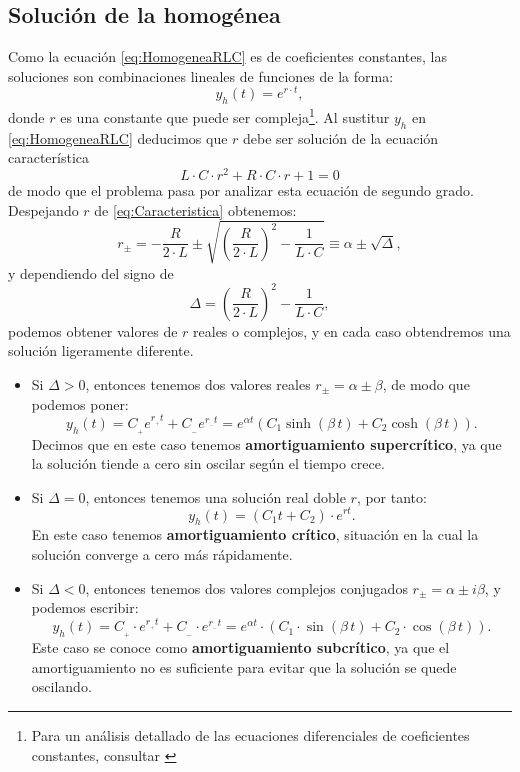 \subsection{Solución de la homogénea} \label{solucionHomogenea}
Como la ecuación \eqref{eq:HomogeneaRLC} es de coeficientes constantes, las soluciones son combinaciones lineales de funciones de la forma:
\[
y_h(t) = e^{r\cdot t},
\]
donde $r$ es una constante que puede ser compleja\footnote{Para un análisis detallado de las ecuaciones diferenciales de coeficientes constantes, consultar \cite[p.~226]{DiPrima}}. Al sustitur $y_h$ en \eqref{eq:HomogeneaRLC} deducimos que $r$ debe ser solución de la ecuación característica
\begin{equation}
\label{eq:Caracteristica}
  L\cdot C\cdot r^2 + R\cdot C\cdot r + 1 = 0
\end{equation}
de modo que el problema pasa por analizar esta ecuación de segundo grado. Despejando $r$ de \eqref{eq:Caracteristica} obtenemos:
\[
r_\pm = -\frac{R}{2\cdot L} \pm \sqrt{\left( \frac{R}{2\cdot L} \right)^2 - \frac{1}{L\cdot C}} \equiv \alpha \pm \sqrt{\Delta},
\]
y dependiendo del signo de
\[
\Delta = \left( \frac{R}{2\cdot L} \right)^2 - \frac{1}{L\cdot C},
\]
podemos obtener valores de $r$ reales o complejos, y en cada caso obtendremos una solución ligeramente diferente.
\begin{itemize}
  \item Si $\Delta > 0$, entonces tenemos dos valores reales $r_{\pm}=\alpha \pm \beta $, de modo que podemos poner:
\[
y_h(t) = C_{\!_+} e^{r_{\!_+} t} + C_{\!_-} e^{r_{\!_-}t} = e^{\alpha t}\left(C_1\sinh(\beta\, t) + C_2 \cosh(\beta\, t)\right).
\]
Decimos que en este caso tenemos \textbf{amortiguamiento supercrítico}, ya que la solución tiende a cero sin oscilar según el tiempo crece.
  \item Si $\Delta = 0$, entonces tenemos una solución real doble $r$, por tanto:
\[
y_h(t) = (C_1t+C_2)\cdot e^{rt}.
\]
En este caso tenemos \textbf{amortiguamiento crítico}, situación en la cual la solución converge a cero más rápidamente.
  \item Si $\Delta < 0$, entonces tenemos dos valores complejos conjugados $r_{\pm}=\alpha \pm i\beta$, y podemos escribir:
\[
y_h(t) = C_{\!_+} \cdot e^{r_{\!_+}  t} + C_{\!_-}\cdot  e^{r_{\!_-} t} = e^{\alpha t}\cdot \left(C_1\cdot \sin(\beta\, t) + C_2 \cdot \cos(\beta\, t)\right).
\]
Este caso se conoce como \textbf{amortiguamiento subcrítico}, ya que el amortiguamiento no es suficiente para evitar que la solución se quede oscilando.
\end{itemize}

